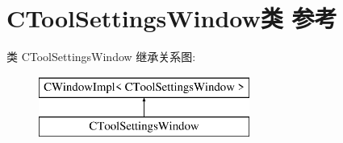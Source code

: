 \hypertarget{class_c_tool_settings_window}{}\section{C\+Tool\+Settings\+Window类 参考}
\label{class_c_tool_settings_window}
类 C\+Tool\+Settings\+Window 继承关系图\+:\begin{figure}[H]
\begin{center}
\leavevmode
\includegraphics[height=2.000000cm]{class_c_tool_settings_window}
\end{center}
\end{figure}
